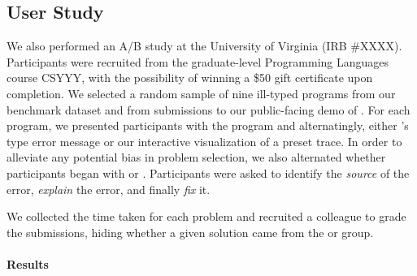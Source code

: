 \subsection{User Study}
\label{sec:nanomaly:user-study}
We also performed an A/B study at the University of Virginia (IRB
\#XXXX). 
%
Participants were recruited from the graduate-level Programming
Languages course CSYYY, with the possibility of winning a \$50 gift
certificate upon completion.
%
We selected a random sample of nine ill-typed programs from our
benchmark dataset and from submissions to our public-facing demo of
\nanomaly.
%
For each program, we presented participants with the program and
alternatingly, either \ocaml's type error message or our interactive
visualization of a preset trace.
%
In order to alleviate any potential bias in problem selection, we also
alternated whether participants began with \ocaml or \nanomaly.
%
Participants were asked to identify the \emph{source} of the error,
\emph{explain} the error, and finally \emph{fix} it.

We collected the time taken for each problem and recruited a colleague
to grade the submissions, hiding whether a given solution came from the
\ocaml or \nanomaly group.

\paragraph{Results}
\label{sec:nanomaly:study-results}
